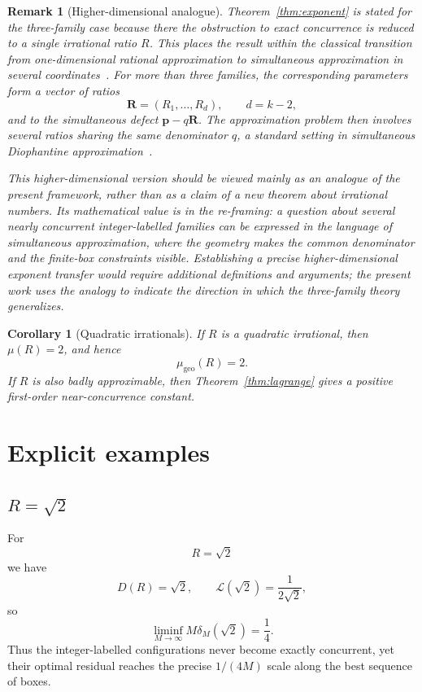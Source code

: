 \documentclass[11pt,a4paper]{article}
\newcommand{\deltam}{\delta_M}
\newtheorem{corollary}[theorem]{Corollary}
\newtheorem{remark}[theorem]{Remark}
\begin{document}
\begin{remark}[Higher-dimensional analogue]
Theorem~\ref{thm:exponent} is stated for the three-family case because there the obstruction to exact concurrence is reduced to a single irrational ratio $R$. This places the result within the classical transition from one-dimensional rational approximation to simultaneous approximation in several coordinates~\cite{schmidt1980,waldschmidt2009}. For more than three families, the corresponding parameters form a vector of ratios
\[
\mathbf R=(R_1,\ldots,R_d),\qquad d=k-2,
\]
and to the simultaneous defect $\mathbf p-q\mathbf R$. The approximation problem then involves several ratios sharing the same denominator $q$, a standard setting in simultaneous Diophantine approximation~\cite{schmidt1980,khintchine1924,badzhinpollingtonvelani}.

This higher-dimensional version should be viewed mainly as an analogue of the present framework, rather than as a claim of a new theorem about irrational numbers. Its mathematical value is in the re-framing: a question about several nearly concurrent integer-labelled families can be expressed in the language of simultaneous approximation, where the geometry makes the common denominator and the finite-box constraints visible. Establishing a precise higher-dimensional exponent transfer would require additional definitions and arguments; the present work uses the analogy to indicate the direction in which the three-family theory generalizes.
\end{remark}

\begin{corollary}[Quadratic irrationals]\label{cor:quad}
If $R$ is a quadratic irrational, then $\mu(R)=2$, and hence
\[
\mu_{\mathrm{geo}}(R)=2.
\]
If $R$ is also badly approximable, then Theorem~\ref{thm:lagrange} gives a positive first-order
near-concurrence constant.
\end{corollary}

\section{Explicit examples}

\subsection{$R=\sqrt2$}
For
\[
R=\sqrt2
\]
we have
\[
D(R)=\sqrt2,
\qquad
\mathcal L(\sqrt2)=\frac1{2\sqrt2},
\]
so
\[
\boxed{\liminf_{M\to\infty}M\deltam(\sqrt2)=\frac14.}
\]
Thus the integer-labelled configurations never become exactly concurrent, yet their optimal
residual reaches the precise $1/(4M)$ scale along the best sequence of boxes.
\end{document}
